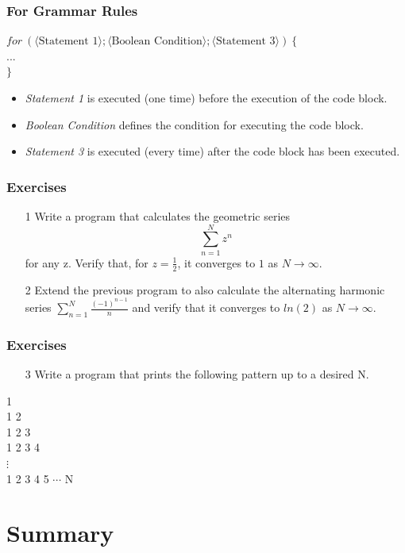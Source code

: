 \documentclass{beamer}
\newcommand{\cindent}{\hskip20pt}
\begin{document}
	\begin{frame}
		\frametitle{For Grammar Rules}
		$for\ (\langle \text{Statement 1} \rangle; \langle \text{Boolean Condition} \rangle; \langle \text{Statement 3} \rangle)\ \{$\\
			\cindent $...$\\
		$\}$\\
		\begin{itemize}
			\item \emph{Statement 1} is executed (one time) before the execution of the code block.
			\item \emph{Boolean Condition} defines the condition for executing the code block.
			\item \emph{Statement 3} is executed (every time) after the code block has been executed.
		\end{itemize}
	\end{frame}

	\begin{frame}
		\frametitle{Exercises}
		\begin{enumerate}
			\item[1] Write a program that calculates the geometric series \[\sum_{n=1}^{N}{z^n}\] for any z. Verify that, for $z=\frac{1}{2}$, it converges to $1$ as $N \to \infty$.
			\pause
			\item[2] Extend the previous program to also calculate the alternating harmonic series $ \sum_{n=1}^{N}{\frac{(-1)^{n-1}}{n}}$ and verify that it converges to $ln(2)$ as $N \to \infty$.
		\end{enumerate}
	\end{frame}

	\begin{frame}
		\frametitle{Exercises}
		\begin{enumerate}
			\item[3] Write a program that prints the following pattern up to a desired N.
		\end{enumerate}
		1\\
		1 2\\
		1 2 3\\
		1 2 3 4\\
		$\vdots$\\
		1 2 3 4 5 $\cdots$ N
	\end{frame}

	\section{Summary}
	
\end{document}

